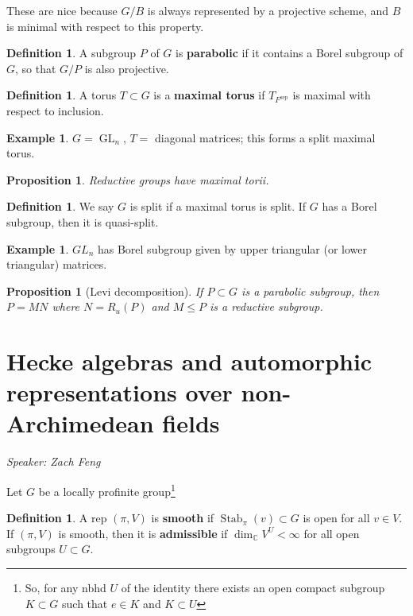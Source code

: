 \documentclass[11pt]{report}
\newcommand{\1}{\mathbbm 1}
\newcommand{\C}{\mathbb{C}}
\DeclareMathOperator{\sep}{sep}
\DeclareMathOperator{\GL}{GL}
\DeclareMathOperator{\Stab}{Stab}
\theoremstyle{plain}
\newcounter{ex}
\newtheorem{prop}[thm]{Proposition}
\theoremstyle{definition}
\newtheorem{mydef}[thm]{Definition}
\newtheorem{example}[thm]{Example}
\theoremstyle{remark}
\numberwithin{equation}{section}
\begin{document}
These are nice because $G/B$ is always represented by a projective
scheme, and $B$ is minimal with respect to this property.
\begin{mydef}
  A subgroup $P$ of $G$ is \textbf{parabolic} if it contains a Borel
  subgroup of $G$, so that $G/P$ is also projective.
\end{mydef}

\begin{mydef}
A torus $T \subset G$ is a \textbf{maximal torus} if $T_{F^{\sep}}$ is
maximal with respect to inclusion.
\end{mydef}
\begin{example}
  $G = \GL_{n}$, $T = $ diagonal matrices; this forms a split maximal torus.
\end{example}

\begin{prop}
  Reductive groups have maximal torii.
\end{prop}
\begin{mydef}
  We say $G$ is split if a maximal torus is split. If $G$ has a
  Borel subgroup, then it is quasi-split.
\end{mydef}



\begin{example}
  $GL_{n}$ has Borel subgroup given by upper triangular (or lower
  triangular) matrices.
\end{example}

\begin{prop}[Levi decomposition]
  If $P \subset G$ is a parabolic subgroup, then $P = MN$ where $N =
  R_{u}(P)$ and $M \le P$ is a reductive subgroup.
\end{prop}

\section{Hecke algebras and automorphic representations over
  non-Archimedean fields}
\emph{Speaker: Zach Feng}


Let $G$ be a locally profinite group\footnote{So, for any nbhd $U$ of
  the identity there exists an open compact subgroup $K \subset G$ such that
  $e \in K$ and $K \subset U$}
\begin{mydef}
  A rep $(\pi,V)$ is \textbf{smooth} if $\Stab_{\pi}(v) \subset G$ is open for
  all $ v\in V$.
  If $(\pi,V)$ is smooth, then it is \textbf{admissible} if $\dim_{\C}
  V^{U} < \infty$ for all open subgroups $U \subset G$. 
\end{mydef}
\end{document}
